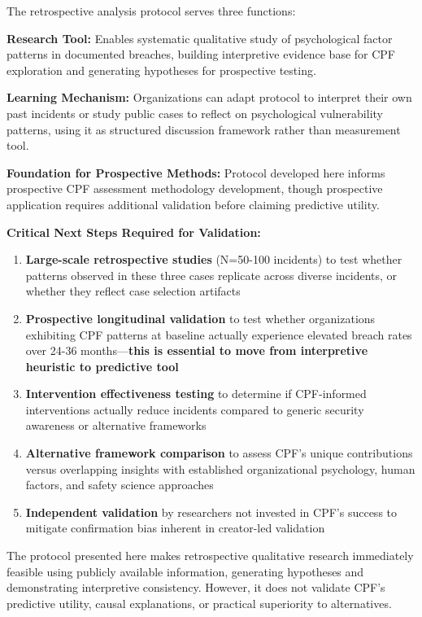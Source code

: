 \documentclass[11pt,a4paper]{article}
\begin{document}
The retrospective analysis protocol serves three functions:

\textbf{Research Tool:} Enables systematic qualitative study of psychological factor patterns in documented breaches, building interpretive evidence base for CPF exploration and generating hypotheses for prospective testing.

\textbf{Learning Mechanism:} Organizations can adapt protocol to interpret their own past incidents or study public cases to reflect on psychological vulnerability patterns, using it as structured discussion framework rather than measurement tool.

\textbf{Foundation for Prospective Methods:} Protocol developed here informs prospective CPF assessment methodology development, though prospective application requires additional validation before claiming predictive utility.

\textbf{Critical Next Steps Required for Validation:}

\begin{enumerate}
\item \textbf{Large-scale retrospective studies} (N=50-100 incidents) to test whether patterns observed in these three cases replicate across diverse incidents, or whether they reflect case selection artifacts
\item \textbf{Prospective longitudinal validation} to test whether organizations exhibiting CPF patterns at baseline actually experience elevated breach rates over 24-36 months—\textbf{this is essential to move from interpretive heuristic to predictive tool}
\item \textbf{Intervention effectiveness testing} to determine if CPF-informed interventions actually reduce incidents compared to generic security awareness or alternative frameworks
\item \textbf{Alternative framework comparison} to assess CPF's unique contributions versus overlapping insights with established organizational psychology, human factors, and safety science approaches
\item \textbf{Independent validation} by researchers not invested in CPF's success to mitigate confirmation bias inherent in creator-led validation
\end{enumerate}

The protocol presented here makes retrospective qualitative research immediately feasible using publicly available information, generating hypotheses and demonstrating interpretive consistency. However, it does not validate CPF's predictive utility, causal explanations, or practical superiority to alternatives.
\end{document}
